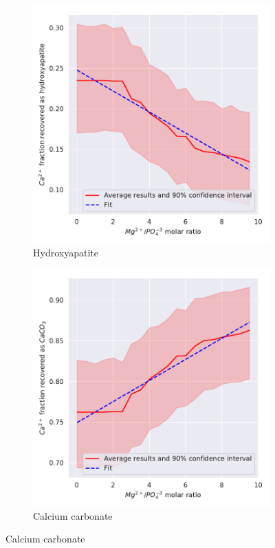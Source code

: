 \begin{refsection}[referencesCh3]
\begin{figure}[h]
\begin{subfigure}[t]{0.25\textheight}
		\includegraphics[width=\textwidth]{gfx/AppendixB/x_plotHAPYield_Mg} 
		\caption{Hydroxyapatite}
		\label{fig:Mg_influence_HAP}
	\end{subfigure} 
	\begin{subfigure}[t]{0.25\textheight}
		\includegraphics[width=\textwidth]{gfx/AppendixB/x_plotCaCO3Yield_Mg}
		\caption{Calcium carbonate}
		\label{fig:Mg_influence_CaCO3}
	\end{subfigure}
	

\end{figure}
\end{refsection}
